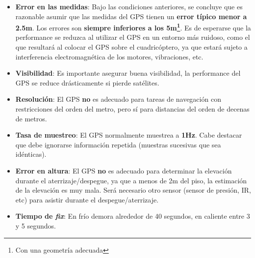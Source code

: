 \documentclass[main]{subfiles}
\begin{document}
\begin{itemize}
\item \textbf{Error en las medidas}: Bajo las condiciones anteriores, se concluye que es razonable asumir que las medidas del GPS tienen un \textbf{error t\'ipico menor a 2.5m}. Los errores son \textbf{siempre inferiores a los 5m\footnote{Con una geometr\'ia adecuada}}. Es de esperarse que la performance se reduzca al utilizar el GPS en un entorno más ruidoso, como el que resultará al colocar el GPS sobre el cuadricóptero, ya que estará sujeto a interferencia electromagnética de los motores, vibraciones, etc.
\item \textbf{Visibilidad}: Es importante asegurar buena visibilidad, la performance del GPS se reduce drásticamente si pierde satélites.
\item \textbf{Resolución}: El GPS \textbf{no} es adecuado para tareas de navegación con restricciones del orden del metro, pero sí para distancias del orden de decenas de metros.
\item \textbf{Tasa de muestreo}: El GPS normalmente muestrea a \textbf{1Hz}. Cabe destacar que debe ignorarse información repetida (muestras sucesivas que sea idénticas).
\item \textbf{Error en altura}: El GPS \textbf{no} es adecuado para determinar la elevación durante el aterrizaje/despegue, ya que a menos de 2m del piso, la estimación de la elevación es muy mala. Será necesario otro sensor (sensor de presión, IR, etc) para asistir durante el despegue/aterrizaje.
\item \textbf{Tiempo de \textit{fix}}: En frío demora alrededor de 40 segundos, en caliente entre 3 y 5 segundos.
\end{itemize}
\end{document}

